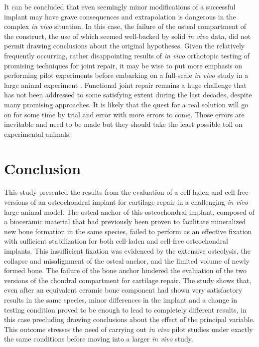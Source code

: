 \documentclass[twocolumn, empirical, authordate, issue]{jote-new-article}
\begin{document}
It can be concluded that even seemingly minor modifications of a successful implant may have grave consequences and extrapolation is dangerous in the complex \emph{in vivo} situation. In this case, the failure of the osteal compartment of the construct, the use of which seemed well-backed by solid \emph{in vivo} data, did not permit drawing conclusions about the original hypotheses. Given the relatively frequently occurring, rather disappointing results of \emph{in vivo}
orthotopic testing of promising techniques for joint repair, it may be wise to put more emphasis on performing pilot experiments before embarking on a full-scale \emph{in vivo} study in a large animal experiment \parencite{VindasBolanos2017}. Functional joint repair remains a huge challenge that has not been addressed to some satisfying extent during the last decades, despite many promising approaches. It is likely that the quest for a real solution will go on for some time by trial and error with more errors to come. Those errors are inevitable and need to be made but they should take the least possible toll on experimental animals.

\section{Conclusion} 

This study presented the results from the evaluation of a cell-laden and cell-free versions of an osteochondral implant for cartilage repair in a challenging \emph{in vivo} large animal model. The osteal anchor of this osteochondral implant, composed of a bioceramic material that had previously been proven to facilitate mineralized new bone formation in the same species, failed to perform as an effective fixation with sufficient stabilization for both cell-laden and cell-free osteochondral implants. This insufficient fixation was evidenced by the extensive osteolysis, the collapse and misalignment of the osteal anchor, and the limited volume of newly formed bone. The failure of the bone anchor hindered the evaluation of the two versions of the chondral compartment for cartilage repair. The study shows that, even after an equivalent ceramic bone component had shown very satisfactory results in the same species, minor differences in the implant and a change in testing condition proved to be enough to lead to completely different results, in this case precluding drawing conclusions about the effect of the principal variable. This outcome stresses the need of carrying out \emph{in vivo} pilot studies under exactly the same conditions before moving into a larger \emph{in vivo} study.
\end{document}
